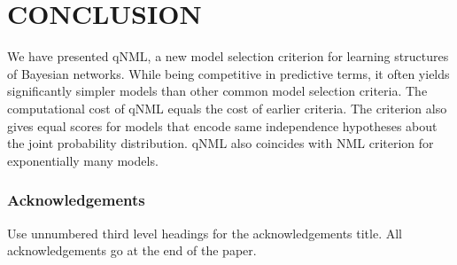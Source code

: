 \documentclass[letterpaper]{article}
\begin{document}
\section{CONCLUSION}

We have presented qNML, a new model selection criterion for learning
structures of Bayesian networks.  While being competitive in
predictive terms, it often yields significantly simpler models than
other common model selection criteria.  The computational cost of qNML
equals the cost of earlier criteria.  The criterion also gives equal
scores for models that encode same independence hypotheses about the
joint probability distribution.  qNML also coincides with NML
criterion for exponentially many models.

\subsubsection*{Acknowledgements}

Use unnumbered third level headings for the acknowledgements title.
All acknowledgements go at the end of the paper.





\end{document}
